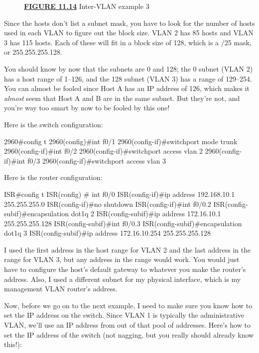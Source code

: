 \begin{figure}
\centering
\caption{{\protect\hyperlink{c11.xhtmlux5cux23figureanchor11-14}{\textbf{FIGURE
11.14}} Inter-VLAN example 3}}
\end{figure}

Since the hosts don't list a subnet mask, you have to look for the
number of hosts used in each VLAN to figure out the block size. VLAN 2
has 85 hosts and VLAN 3 has 115 hosts. Each of these will fit in a block
size of 128, which is a /25 mask, or 255.255.255.128.

You should know by now that the subnets are 0 and 128; the 0 subnet
(VLAN 2) has a host range of 1--126, and the 128 subnet (VLAN 3) has a
range of 129--254. You can almost be fooled since Host A has an IP
address of 126, which makes it \emph{almost} seem that Host A and B are
in the same subnet. But they're not, and you're way too smart by now to
be fooled by this one!

Here is the switch configuration:

\begin{cli}
2960#config t
2960(config)#int f0/1
2960(config-if)#switchport mode trunk
2960(config-if)#int f0/2
2960(config-if)#switchport access vlan 2
2960(config-if)#int f0/3
2960(config-if)#switchport access vlan 3
\end{cli}

Here is the router configuration:

\begin{cli}
ISR#config t
ISR(config) # int f0/0
ISR(config-if)#ip address 192.168.10.1 255.255.255.0
ISR(config-if)#no shutdown
ISR(config-if)#int f0/0.2
ISR(config-subif)#encapsulation dot1q 2
ISR(config-subif)#ip address 172.16.10.1 255.255.255.128
ISR(config-subif)#int f0/0.3
ISR(config-subif)#encapsulation dot1q 3
ISR(config-subif)#ip address 172.16.10.254 255.255.255.128
\end{cli}

I used the first address in the host range for VLAN 2 and the last
address in the range for VLAN 3, but any address in the range would
work. You would just have to configure the host's default gateway to
whatever you make the router's address. Also, I used a different subnet
for my physical interface, which is my management VLAN router's address.

Now, before we go on to the next example, I need to make sure you know
how to set the IP address on the switch. Since VLAN 1 is typically the
administrative VLAN, we'll use an IP address from out of that pool of
addresses. Here's how to set the IP address of the switch (not nagging,
but you really should already know this!):

